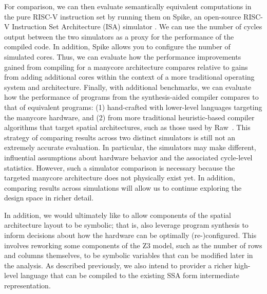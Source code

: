 \documentclass{sig-alternate-05-2015}
\begin{document}
For comparison, we can then evaluate semantically equivalent computations in the pure RISC-V instruction set by running them on Spike, an open-source RISC-V Instruction Set Architecture (ISA) simulator \cite{risc-v}. We can use the number of cycles output between the two simulators as a proxy for the performance of the compiled code. In addition, Spike allows you to configure the number of simulated cores. Thus, we can evaluate how the performance improvements gained from compiling for a manycore architecture compares relative to gains from adding additional cores within the context of a more traditional operating system and architecture. Finally, with additional benchmarks, we can evaluate how the performance of programs from the synthesis-aided compiler compares to that of equivalent programs: (1) hand-crafted with lower-level languages targeting the manycore hardware, and (2) from more traditional heuristic-based compiler algorithms that target spatial architectures, such as those used by Raw~\cite{raw}. This strategy of comparing results across two distinct simulators is still not an extremely accurate evaluation. In particular, the simulators may make different, influential assumptions about hardware behavior and the associated cycle-level statistics. However, such a simulator comparison is necessary because the targeted manycore architecture does not physically exist yet. In addition, comparing results across simulations will allow us to continue exploring the design space in richer detail. 

In addition, we would ultimately like to allow components of the spatial architecture layout to be symbolic; that is, also leverage program synthesis to inform decisions about how the hardware can be optimally (re-)configured. This involves reworking some components of the Z3 model, such as the number of rows and columns themselves, to be symbolic variables that can be modified later in the analysis. As described previously, we also intend to provider a richer high-level language that can be compiled to the existing SSA form intermediate representation.
\end{document}
